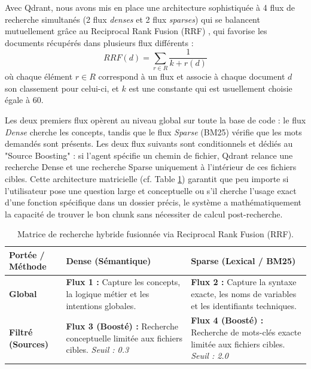 Avec Qdrant, nous avons mis en place une architecture sophistiquée à 4 flux de recherche simultanés (2 flux \textit{denses} et 2 flux \textit{sparses}) qui se balancent mutuellement grâce au Reciprocal Rank Fusion (RRF) \cite{Cormack2009}, qui favorise les documents récupérés dans plusieurs flux différents :
$$RRF(d)=\sum_{r\in R}\frac{1}{k+r(d)}$$
où chaque élément $r\in R$ correspond à un flux et associe à chaque document $d$ son classement pour celui-ci, et $k$ est une constante qui est usuellement choisie égale à 60.

Les deux premiers flux opèrent au niveau global sur toute la base de code : le flux \textit{Dense} cherche les concepts, tandis que le flux \textit{Sparse} (BM25) vérifie que les mots demandés sont présents. Les deux flux suivants sont conditionnels et dédiés au "Source Boosting" : si l'agent spécifie un chemin de fichier, Qdrant relance une recherche Dense et une recherche Sparse uniquement à l'intérieur de ces fichiers cibles. Cette architecture matricielle (cf. Table \ref{tab:matrice_flux}) garantit que peu importe si l'utilisateur pose une question large et conceptuelle ou s'il cherche l'usage exact d'une fonction spécifique dans un dossier précis, le système a mathématiquement la capacité de trouver le bon chunk sans nécessiter de calcul post-recherche.\\

\begin{table}[htbp]
\centering
\renewcommand{\arraystretch}{1.5}
\begin{tabularx}{\textwidth}{l >{\raggedright\arraybackslash}X >{\raggedright\arraybackslash}X}
\toprule
\textbf{Portée / Méthode} & \textbf{Dense (Sémantique)} & \textbf{Sparse (Lexical / BM25)} \\ 
\midrule
\textbf{Global} & 
\textbf{Flux 1 :} Capture les concepts, la logique métier et les intentions globales. & 
\textbf{Flux 2 :} Capture la syntaxe exacte, les noms de variables et les identifiants techniques. \\ 
\addlinespace
\textbf{Filtré (Sources)} & 
\textbf{Flux 3 (Boosté) :} Recherche conceptuelle limitée aux fichiers cibles. \newline \textit{Seuil : 0.3} & 
\textbf{Flux 4 (Boosté) :} Recherche de mots-clés exacte limitée aux fichiers cibles. \newline \textit{Seuil : 2.0} \\ 
\bottomrule
\end{tabularx}
\caption{Matrice de recherche hybride fusionnée via Reciprocal Rank Fusion (RRF).}
\label{tab:matrice_flux}
\end{table}

